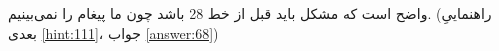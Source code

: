 \section{}
\paragraph{}\label{hint:92}
واضح است که مشکل باید قبل از خط 28 باشد چون ما پیغام  را نمی‌بینیم. (راهنماییِ بعدی \ref{hint:111}، جواب \ref{answer:68})